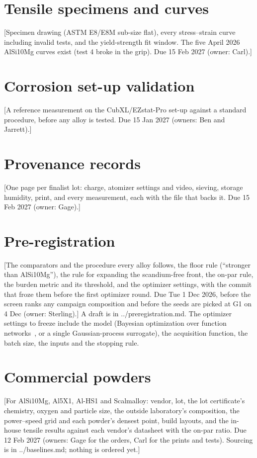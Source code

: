 \documentclass[11pt]{article}
\newcommand{\placeholder}[1]{\textcolor{red!75!black}{[#1]}}
\newcommand{\AlSi}{AlSi10Mg}
\newcommand{\Scal}{Scalmalloy}
\begin{document}
\section{Tensile specimens and curves}
\placeholder{Specimen drawing (ASTM E8/E8M sub-size flat), every stress--strain curve including invalid tests, and the yield-strength fit window. The five April 2026 \AlSi{} curves exist (test 4 broke in the grip). Due 15 Feb 2027 (owner: Carl).}

\section{Corrosion set-up validation}
\placeholder{A reference measurement on the CubXL/EZstat-Pro set-up against a standard procedure, before any alloy is tested. Due 15 Jan 2027 (owners: Ben and Jarrett).}

\section{Provenance records}
\placeholder{One page per finalist lot: charge, atomizer settings and video, sieving, storage humidity, print, and every measurement, each with the file that backs it. Due 15 Feb 2027 (owner: Gage).}

\section{Pre-registration}
\placeholder{The comparators and the procedure every alloy follows, the floor rule (``stronger than \AlSi''), the rule for expanding the scandium-free front, the on-par rule, the burden metric and its threshold, and the optimizer settings, with the commit that froze them before the first optimizer round. Due Tue 1 Dec 2026, before the screen ranks any campaign composition and before the seeds are picked at G1 on 4 Dec (owner: Sterling).} A draft is in ../preregistration.md.
The optimizer settings to freeze include the model (Bayesian optimization over function networks~\cite{astudillo2021,buathong2024}, or a single Gaussian-process surrogate), the acquisition function, the batch size, the inputs and the stopping rule.

\section{Commercial powders}
\placeholder{For AlSi10Mg, Al5X1, Al-HS1 and \Scal{}: vendor, lot, the lot certificate's chemistry, oxygen and particle size, the outside laboratory's composition, the power--speed grid and each powder's densest point, build layouts, and the in-house tensile results against each vendor's datasheet with the on-par ratio. Due 12 Feb 2027 (owners: Gage for the orders, Carl for the prints and tests). Sourcing is in ../baselines.md; nothing is ordered yet.}



\end{document}
